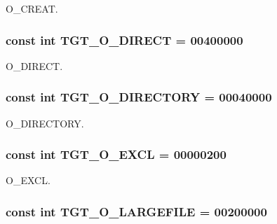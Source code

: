 O\_\-CREAT. \hypertarget{classPowerLinux_ae5d685a6a2ee8c6fe0ede370f0bec588}{
\subsubsection[{TGT\_\-O\_\-DIRECT}]{\setlength{\rightskip}{0pt plus 5cm}const int {\bf TGT\_\-O\_\-DIRECT} = 00400000}}
\label{classPowerLinux_ae5d685a6a2ee8c6fe0ede370f0bec588}


O\_\-DIRECT. \hypertarget{classPowerLinux_a1f10d158ad65ad6389078ba44629788a}{
\subsubsection[{TGT\_\-O\_\-DIRECTORY}]{\setlength{\rightskip}{0pt plus 5cm}const int {\bf TGT\_\-O\_\-DIRECTORY} = 00040000}}
\label{classPowerLinux_a1f10d158ad65ad6389078ba44629788a}


O\_\-DIRECTORY. \hypertarget{classPowerLinux_a10d5d118d15b51ebdd4b16dc78342d1d}{
\subsubsection[{TGT\_\-O\_\-EXCL}]{\setlength{\rightskip}{0pt plus 5cm}const int {\bf TGT\_\-O\_\-EXCL} = 00000200}}
\label{classPowerLinux_a10d5d118d15b51ebdd4b16dc78342d1d}


O\_\-EXCL. \hypertarget{classPowerLinux_a9600e092a6309f94d92129ce5f85b945}{
\subsubsection[{TGT\_\-O\_\-LARGEFILE}]{\setlength{\rightskip}{0pt plus 5cm}const int {\bf TGT\_\-O\_\-LARGEFILE} = 00200000}}
\label{classPowerLinux_a9600e092a6309f94d92129ce5f85b945}


